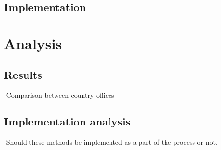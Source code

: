 \documentclass[12pt,a4paper,oneside,pdftex]{report}
\begin{document}
    \section{Implementation}
    \label{sec:implementation}
    
\chapter{Analysis}
\label{chapter:analysis}

    \section{Results}
    \label{sec:results}
    -Comparison between country offices

    \section{Implementation analysis}
    \label{sec:implementationanalysis}
    -Should these methods be implemented as a part of the process or not.







\end{document}
